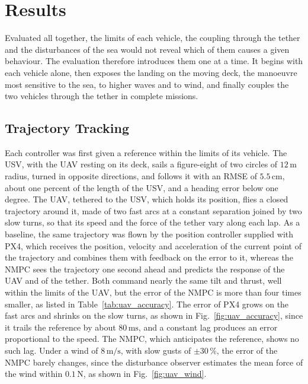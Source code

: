 \section{Results}
\label{sec:resul}

Evaluated all together, the limits of each vehicle, the coupling through the tether and the disturbances of the sea would not reveal which of them causes a given behaviour. The evaluation therefore introduces them one at a time. It begins with each vehicle alone, then exposes the landing on the moving deck, the manoeuvre most sensitive to the sea, to higher waves and to wind, and finally couples the two vehicles through the tether in complete missions.

\subsection{Trajectory Tracking}

Each controller was first given a reference within the limits of its vehicle. The USV, with the UAV resting on its deck, sails a figure-eight of two circles of $12\,\text{m}$ radius, turned in opposite directions, and follows it with an RMSE of $5.5\,\text{cm}$, about one percent of the length of the USV, and a heading error below one degree. The UAV, tethered to the USV, which holds its position, flies a closed trajectory around it, made of two fast arcs at a constant separation joined by two slow turns, so that its speed and the force of the tether vary along each lap. As a baseline, the same trajectory was flown by the position controller supplied with PX4, which receives the position, velocity and acceleration of the current point of the trajectory and combines them with feedback on the error to it, whereas the NMPC sees the trajectory one second ahead and predicts the response of the UAV and of the tether. Both command nearly the same tilt and thrust, well within the limits of the UAV, but the error of the NMPC is more than four times smaller, as listed in Table~\ref{tab:uav_accuracy}. The error of PX4 grows on the fast arcs and shrinks on the slow turns, as shown in Fig.~\ref{fig:uav_accuracy}, since it trails the reference by about $80\,\text{ms}$, and a constant lag produces an error proportional to the speed. The NMPC, which anticipates the reference, shows no such lag. Under a wind of $8\,\text{m/s}$, with slow gusts of $\pm 30\,\%$, the error of the NMPC barely changes, since the disturbance observer estimates the mean force of the wind within $0.1\,\text{N}$, as shown in Fig.~\ref{fig:uav_wind}.

